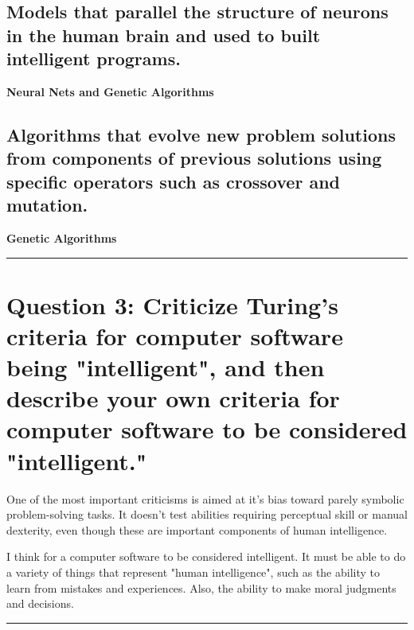 \documentclass[letterpaper, 10 pt, conference]{ieeeconf}  %
\begin{document}
\subsection{Models that parallel the structure of neurons in the human brain and used to built intelligent
programs.}
\begin{flushright}
\textbf{Neural Nets and Genetic Algorithms}
\end{flushright}

\subsection{Algorithms that evolve new problem solutions from components of previous solutions using
specific operators such as crossover and mutation.}
\begin{flushright}
\textbf{Genetic Algorithms}
\end{flushright}
\noindent\rule{8cm}{0.4pt}




\section{\textbf{Question 3:} Criticize Turing's criteria for computer software being "intelligent", and then describe
your own criteria for computer software to be considered "intelligent."}
One of the most important criticisms is aimed at it's bias toward parely symbolic problem-solving tasks. It doesn't test abilities requiring perceptual skill or manual dexterity, even though these are important components of human intelligence.

I think for a computer software to be considered intelligent. It must be able to do a variety of things  that represent "human intelligence", such as the ability to learn from mistakes and experiences. Also, the ability to make moral judgments and decisions.
\noindent\rule{8cm}{0.4pt}
\end{document}
